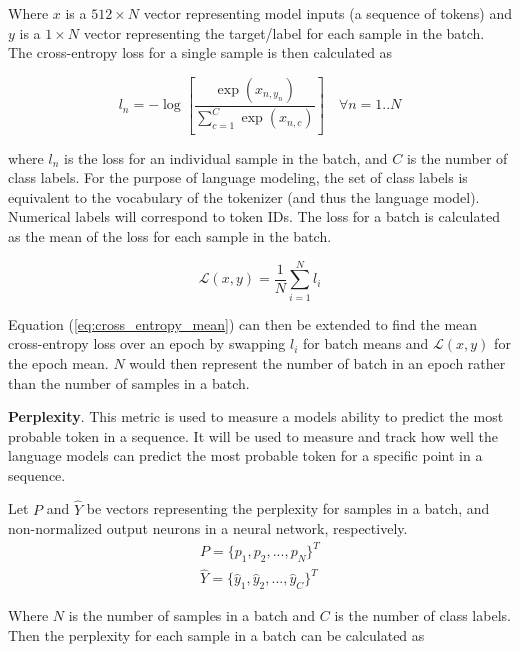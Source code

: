 \documentclass[12pt]{article}
\begin{document}
\noindent
Where $x$ is a $512 \times N$ vector representing model inputs (a sequence of tokens) and $y$ is a $1 \times N$ vector representing the target/label
for each sample in the batch. The cross-entropy loss for a single sample is then calculated as

\begin{equation}\label{eq:cross_entropy_loss}
    l_n = -\log \left[\frac{\exp(x_{n,y_n})}{\sum_{c=1}^{C}\exp(x_{n,c})}\right] \quad \forall n=1..N
\end{equation}

\noindent
where $l_n$ is the loss for an individual sample in the batch, and $C$ is the number of class labels. For the purpose of language modeling, the
set of class labels is equivalent to the vocabulary of the tokenizer (and thus the language model). Numerical labels will correspond to token IDs. The
loss for a batch is calculated as the mean of the loss for each sample in the batch.

\begin{equation}\label{eq:cross_entropy_mean}
    \mathcal{L}(x, y) = \frac{1}{N}\sum_{i=1}^{N}l_i
\end{equation}

\noindent
Equation (\ref{eq:cross_entropy_mean}) can then be extended to find the mean cross-entropy loss over an epoch by swapping $l_i$ for batch means and
$\mathcal{L}(x, y)$ for the epoch mean. $N$ would then represent the number of batch in an epoch rather than the number of samples in a batch.

\textbf{Perplexity}. This metric is used to measure a models ability to predict the most probable token in a sequence. It will be used to measure and
track how well the language models can predict the most probable token for a specific point in a sequence.

Let $P$ and $\hat{Y}$ be vectors representing the perplexity for samples in a batch, and non-normalized output neurons in a neural network,
respectively.
\begin{equation}\label{eq:perplexity_defs}
    \begin{gathered}
        P = \{p_1, p_2, ..., p_N\}^T\\
        \hat{Y} = \{\hat{y}_1, \hat{y}_2, ..., \hat{y}_C\}^T
    \end{gathered}
\end{equation}

\noindent
Where $N$ is the number of samples in a batch and $C$ is the number of class labels. Then the perplexity for each sample in a batch can be calculated
as
\end{document}
